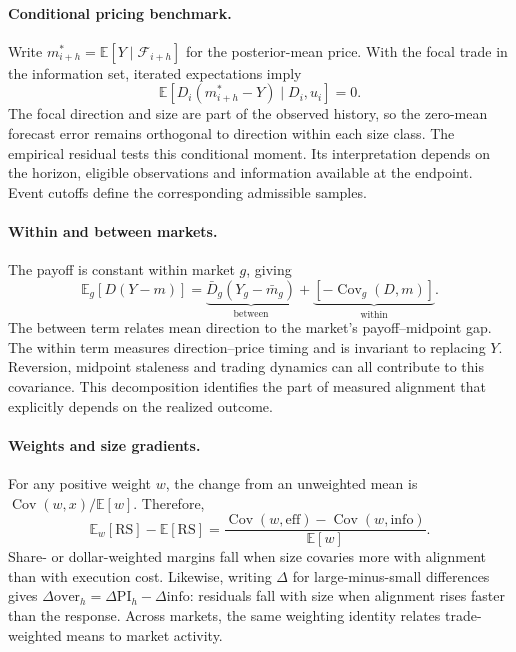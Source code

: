 \documentclass[sigconf,anonymous,nonacm,balance=false]{acmart}
\newcommand{\eff}{\mathrm{eff}}
\newcommand{\info}{\mathrm{info}}
\newcommand{\RS}{\mathrm{RS}}
\newcommand{\PI}{\mathrm{PI}}
\newcommand{\ovr}{\mathrm{over}}
\begin{document}
\paragraph{Conditional pricing benchmark.}
Write $m^*_{i+h}=\mathbb E[Y\mid\mathcal F_{i+h}]$ for the posterior-mean price. With the focal trade in the information set, iterated expectations imply
\begin{equation}
\mathbb E[D_i(m^*_{i+h}-Y)\mid D_i,u_i]=0.\label{eq:orthogonality}
\end{equation}
The focal direction and size are part of the observed history, so the zero-mean forecast error remains orthogonal to direction within each size class. The empirical residual tests this conditional moment. Its interpretation depends on the horizon, eligible observations and information available at the endpoint. Event cutoffs define the corresponding admissible samples.

\paragraph{Within and between markets.}
The payoff is constant within market $g$, giving
\begin{equation}
\mathbb E_g[D(Y-m)] = \underbrace{\bar D_g(Y_g-\bar m_g)}_{\text{between}}+\underbrace{[-\operatorname{Cov}_g(D,m)]}_{\text{within}}.\label{eq:wb}
\end{equation}
The between term relates mean direction to the market's payoff--midpoint gap. The within term measures direction--price timing and is invariant to replacing $Y$. Reversion, midpoint staleness and trading dynamics can all contribute to this covariance. This decomposition identifies the part of measured alignment that explicitly depends on the realized outcome.

\paragraph{Weights and size gradients.}
For any positive weight $w$, the change from an unweighted mean is $\operatorname{Cov}(w,x)/\mathbb E[w]$. Therefore,
\begin{equation}
\mathbb E_w[\RS]-\mathbb E[\RS]
=\frac{\operatorname{Cov}(w,\eff)-\operatorname{Cov}(w,\info)}{\mathbb E[w]}.\label{eq:margin_cov}
\end{equation}
Share- or dollar-weighted margins fall when size covaries more with alignment than with execution cost. Likewise, writing $\Delta$ for large-minus-small differences gives $\Delta\ovr_h=\Delta\PI_h-\Delta\info$: residuals fall with size when alignment rises faster than the response. Across markets, the same weighting identity relates trade-weighted means to market activity.
\end{document}
